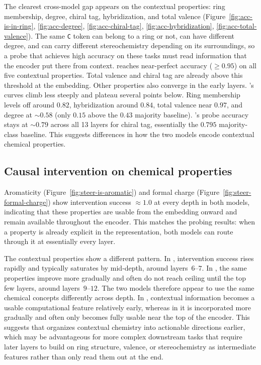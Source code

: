 The clearest cross-model gap appears on the contextual properties: ring membership, degree, chiral tag, hybridization, and total valence (Figure~\ref{fig:acc-is-in-ring}, \ref{fig:acc-degree}, \ref{fig:acc-chiral-tag}, \ref{fig:acc-hybridization}, \ref{fig:acc-total-valence}). The same \texttt{C} token can belong to a ring or not, can have different degree, and can carry different stereochemistry depending on its surroundings, so a probe that achieves high accuracy on these tasks must read information that the encoder put there from context.
\smi reaches near-perfect accuracy ($\geq 0.95$) on all five contextual properties. Total valence and chiral tag are already above this threshold at the embedding. Other properties also converge in the early layers. \molm's curves climb less steeply and plateau several points below. Ring membership levels off around $0.82$, hybridization around $0.84$, total valence near $0.97$, and degree at $\sim 0.58$ (only $0.15$ above the $0.43$ majority baseline). \molm's probe accuracy stays at $\sim 0.79$ across all 13 layers for chiral tag, essentially the $0.795$ majority-class baseline. This suggests differences in how the two models encode contextual chemical properties.

\subsection{Causal intervention on chemical properties}
\label{sec:res-steer}


Aromaticity (Figure~\ref{fig:steer-is-aromatic}) and formal charge (Figure~\ref{fig:steer-formal-charge}) show intervention success $\approx 1.0$ at every depth in both models, indicating that these properties are usable from the embedding onward and remain available throughout the encoder. This matches the probing results: when a property is already explicit in the representation, both models can route through it at essentially every layer.

The contextual properties show a different pattern. In \smi, intervention success rises rapidly and typically saturates by mid-depth, around layers~$6$--$7$. In \molm, the same properties improve more gradually and often do not reach ceiling until the top few layers, around layers~$9$--$12$. The two models therefore appear to use the same chemical concepts differently across depth. In \smi, contextual information becomes a usable computational feature relatively early, whereas in \molm it is incorporated more gradually and often only becomes fully usable near the top of the encoder. This suggests that \smi organizes contextual chemistry into actionable directions earlier, which may be advantageous for more complex downstream tasks that require later layers to build on ring structure, valence, or stereochemistry as intermediate features rather than only read them out at the end.

